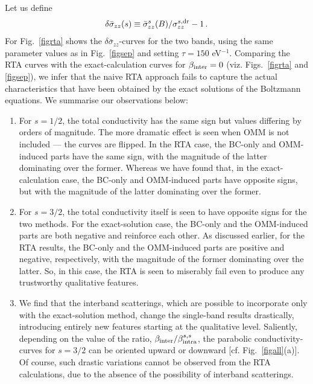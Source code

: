 \documentclass[aps,prb,onecolumn,nofootinbib,citeautoscript,10pt, showkeys]{revtex4-2}
\begin{document}
Let us define
\begin{align}
\delta {\bar \sigma}_{zz} (s) \equiv \bar \sigma^s_{zz} (B) / \sigma^{s,\rm dr}_{zz} - 1 \,.
\end{align}
For Fig.~\ref{figrta} shows the $\delta {\bar \sigma}_{zz}$-curves for the two bands, using the same parameter values as in Fig.~\ref{figsep} and setting $\tau =  150 $ eV$^{-1}$. Comparing the RTA curves with the exact-calculation curves for $\beta_{\rm inter} = 0$ (viz. Figs.~\ref{figrta} and \ref{figsep}), we infer that the naive RTA approach fails to capture the actual characteristics that have been obtained by the exact solutions
of the Boltzmann equations. We summarise our observations below:
\begin{enumerate}
\item For $s=1/2$, the total conductivity has the same sign but values differing by orders of magnitude. The more dramatic effect is seen when OMM is not included --- the curves are flipped. In the RTA case, the BC-only and OMM-induced parts have the same sign, with the magnitude of the latter dominating over the former. Whereas we have found that, in the exact-calculation case, the BC-only and OMM-induced parts have opposite signs, but with the magnitude of the latter dominating over the former.

\item For $s=3/2$, the total conductivity itself is seen to have opposite signs for the two methods. For the exact-solution case, the BC-only and the OMM-induced parts are both negative and reinforce each other. As discussed earlier, for the RTA results, the BC-only and the OMM-induced parts are positive and negative, respectively, with the magnitude of the former dominating over the latter. So, in this case, the RTA is seen to miserably fail even to produce any trustworthy qualitative features. 

\item We find that the interband scatterings, which are possible to incorporate only with the exact-solution method, change the single-band results drastically, introducing entirely new features starting at the qualitative level. Saliently, depending on the value of the ratio, $ \beta_{\rm inter} / \beta_{\rm intra}^{s,s} $, the parabolic conductivity-curves for $s=3/2$ can be oriented upward or downward [cf. Fig.~\ref{figall}(a)]. Of course, such drastic variations cannot be observed from the RTA calculations, due to the absence of the possibility of interband scatterings.

\end{enumerate}
\end{document}
